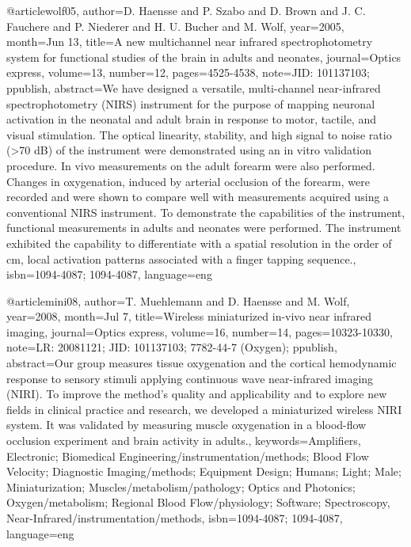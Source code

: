 

@article{wolf05,
	author={D. Haensse and P. Szabo and D. Brown and J. C. Fauchere and P. Niederer and H. U. Bucher and M. Wolf},
	year={2005},
	month={Jun 13},
	title={A new multichannel near infrared spectrophotometry system for functional studies of the brain in adults and neonates},
	journal={Optics express},
	volume={13},
	number={12},
	pages={4525-4538},
	note={JID: 101137103; ppublish},
	abstract={We have designed a versatile, multi-channel near-infrared spectrophotometry (NIRS) instrument for the purpose of mapping neuronal activation in the neonatal and adult brain in response to motor, tactile, and visual stimulation. The optical linearity, stability, and high signal to noise ratio (>70 dB) of the instrument were demonstrated using an in vitro validation procedure. In vivo measurements on the adult forearm were also performed. Changes in oxygenation, induced by arterial occlusion of the forearm, were recorded and were shown to compare well with measurements acquired using a conventional NIRS instrument. To demonstrate the capabilities of the instrument, functional measurements in adults and neonates were performed. The instrument exhibited the capability to differentiate with a spatial resolution in the order of cm, local activation patterns associated with a finger tapping sequence.},
	isbn={1094-4087; 1094-4087},
	language={eng}
}

@article{mini08,
	author={T. Muehlemann and D. Haensse and M. Wolf},
	year={2008},
	month={Jul 7},
	title={Wireless miniaturized in-vivo near infrared imaging},
	journal={Optics express},
	volume={16},
	number={14},
	pages={10323-10330},
	note={LR: 20081121; JID: 101137103; 7782-44-7 (Oxygen); ppublish},
	abstract={Our group measures tissue oxygenation and the cortical hemodynamic response to sensory stimuli applying continuous wave near-infrared imaging (NIRI). To improve the method's quality and applicability and to explore new fields in clinical practice and research, we developed a miniaturized wireless NIRI system. It was validated by measuring muscle oxygenation in a blood-flow occlusion experiment and brain activity in adults.},
	keywords={Amplifiers, Electronic; Biomedical Engineering/instrumentation/methods; Blood Flow Velocity; Diagnostic Imaging/methods; Equipment Design; Humans; Light; Male; Miniaturization; Muscles/metabolism/pathology; Optics and Photonics; Oxygen/metabolism; Regional Blood Flow/physiology; Software; Spectroscopy, Near-Infrared/instrumentation/methods},
	isbn={1094-4087; 1094-4087},
	language={eng}
}

